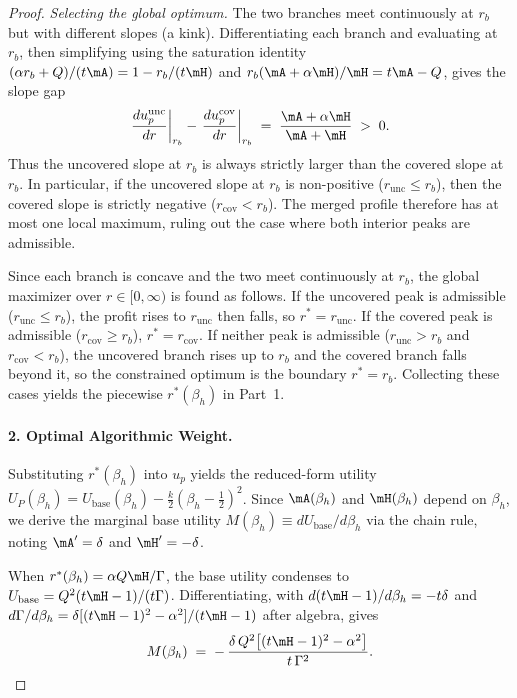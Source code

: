 \begin{proof}
\emph{Selecting the global optimum.} The two branches meet continuously at $r_b$ but with different slopes (a kink). Differentiating each branch and evaluating at $r_b$, then simplifying using the saturation identity $(\alpha r_b + Q)/(t\mA) = 1 - r_b/(t\mH)$ and $r_b(\mA + \alpha\mH)/\mH = t\mA - Q$, gives the slope gap
\begin{equation}\label{eq:slope-gap-E}
    \left.\frac{du_p^{\mathrm{unc}}}{dr}\right|_{r_b} - \left.\frac{du_p^{\mathrm{cov}}}{dr}\right|_{r_b} \;=\; \frac{\mA + \alpha\mH}{\mA+\mH} \;>\; 0.
\end{equation}
Thus the uncovered slope at $r_b$ is always strictly larger than the covered slope at $r_b$. In particular, if the uncovered slope at $r_b$ is non-positive ($r_{\mathrm{unc}} \le r_b$), then the covered slope is strictly negative ($r_{\mathrm{cov}} < r_b$). The merged profile therefore has at most one local maximum, ruling out the case where both interior peaks are admissible.


Since each branch is concave and the two meet continuously at $r_b$, the global maximizer over $r \in [0,\infty)$ is found as follows. If the uncovered peak is admissible ($r_{\mathrm{unc}} \le r_b$), the profit rises to $r_{\mathrm{unc}}$ then falls, so $r^* = r_{\mathrm{unc}}$. If the covered peak is admissible ($r_{\mathrm{cov}} \ge r_b$), $r^* = r_{\mathrm{cov}}$. If neither peak is admissible ($r_{\mathrm{unc}} > r_b$ and $r_{\mathrm{cov}} < r_b$), the uncovered branch rises up to $r_b$ and the covered branch falls beyond it, so the constrained optimum is the boundary $r^* = r_b$. Collecting these cases yields the piecewise $r^*(\beta_h)$ in Part~1.


\paragraph{2. Optimal Algorithmic Weight.}
Substituting $r^*(\beta_h)$ into $u_p$ yields the reduced-form utility $U_P(\beta_h) = U_{\mathrm{base}}(\beta_h) - \tfrac{k}{2}(\beta_h - \tfrac12)^2$. Since $\mA(\beta_h)$ and $\mH(\beta_h)$ depend on $\beta_h$, we derive the marginal base utility $M(\beta_h) \equiv dU_{\mathrm{base}}/d\beta_h$ via the chain rule, noting $\mA' = \delta$ and $\mH' = -\delta$.
 
When $r^*(\beta_h) = \alpha Q\mH/\Gamma$, the base utility condenses to $U_{\mathrm{base}} = Q^2(t\mH - 1)/(t\Gamma)$. Differentiating, with $d(t\mH - 1)/d\beta_h = -t\delta$ and $d\Gamma/d\beta_h = \delta[(t\mH-1)^2 - \alpha^2]/(t\mH-1)$ after algebra, gives
\[
    M(\beta_h) \;=\; -\,\frac{\delta\,Q^2\bigl[(t\mH - 1)^2 - \alpha^2\bigr]}{t\,\Gamma^2}.
\]
 

\end{proof}
